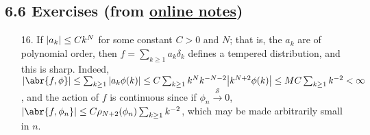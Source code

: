 \documentclass[11pt,leqno]{article}
\theoremstyle{plain}
\theoremstyle{definition}
\numberwithin{equation}{section}
\numberwithin{lem}{section}
\begin{document}
\subsection*{6.6 Exercises (from \href{https://users.oden.utexas.edu/~arbogast/appMath08c.pdf}{online notes})}
\begin{enumerate}
    \item[16.] If $\abs{a_k}\leq Ck^N$ for some constant $C>0$ and $N$; that is, the $a_k$ are of polynomial order, then $f = \sum_{k\geq 1}a_k\delta_k$ defines a tempered distribution, and this is sharp. Indeed, $\abs{\abr{f,\phi}} \leq \sum_{k\geq 1}\abs{a_k\phi(k)} \leq C\sum_{k\geq 1}k^Nk^{-N-2}\abs{k^{N+2}\phi(k)}\leq MC\sum_{k\geq 1}k^{-2}<\infty$, and the action of $f$ is continuous since if $\phi_n\xrightarrow{\mathcal S} 0$, $\abs{\abr{f,\phi_n}} \leq C\rho_{N+2}(\phi_n)\sum_{k\geq 1}k^{-2}$, which may be made arbitrarily small in $n$.
    

\end{enumerate}
\end{document}
